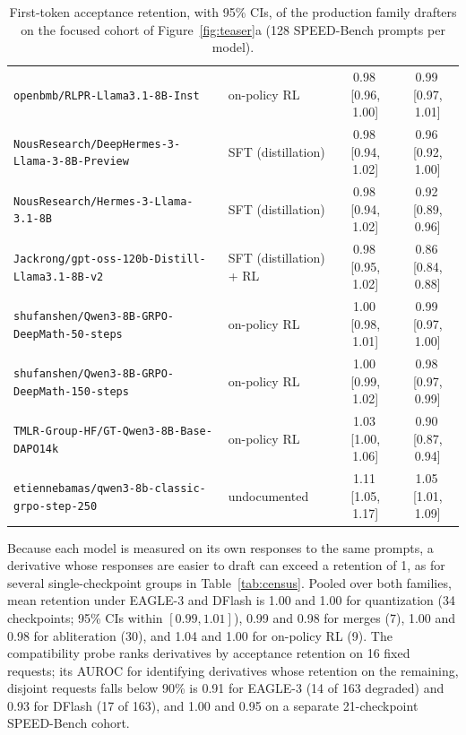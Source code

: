 \documentclass[11pt]{article}
\begin{document}
\begin{table}[t]
\begin{tabular}{@{}llcc@{}}
    \texttt{openbmb/RLPR-Llama3.1-8B-Inst} & on-policy RL & 0.98\,{\scriptsize[0.96, 1.00]} & 0.99\,{\scriptsize[0.97, 1.01]} \\
    \texttt{NousResearch/DeepHermes-3-Llama-3-8B-Preview} & SFT (distillation) & 0.98\,{\scriptsize[0.94, 1.02]} & 0.96\,{\scriptsize[0.92, 1.00]} \\
    \texttt{NousResearch/Hermes-3-Llama-3.1-8B} & SFT (distillation) & 0.98\,{\scriptsize[0.94, 1.02]} & 0.92\,{\scriptsize[0.89, 0.96]} \\
    \texttt{Jackrong/gpt-oss-120b-Distill-Llama3.1-8B-v2} & SFT (distillation) + RL & 0.98\,{\scriptsize[0.95, 1.02]} & 0.86\,{\scriptsize[0.84, 0.88]} \\
    \texttt{shufanshen/Qwen3-8B-GRPO-DeepMath-50-steps} & on-policy RL & 1.00\,{\scriptsize[0.98, 1.01]} & 0.99\,{\scriptsize[0.97, 1.00]} \\
    \texttt{shufanshen/Qwen3-8B-GRPO-DeepMath-150-steps} & on-policy RL & 1.00\,{\scriptsize[0.99, 1.02]} & 0.98\,{\scriptsize[0.97, 0.99]} \\
    \texttt{TMLR-Group-HF/GT-Qwen3-8B-Base-DAPO14k} & on-policy RL & 1.03\,{\scriptsize[1.00, 1.06]} & 0.90\,{\scriptsize[0.87, 0.94]} \\
    \texttt{etiennebamas/qwen3-8b-classic-grpo-step-250} & undocumented & 1.11\,{\scriptsize[1.05, 1.17]} & 1.05\,{\scriptsize[1.01, 1.09]} \\
    \bottomrule
  \end{tabular}
  \caption{First-token acceptance retention, with 95\% CIs, of the production family drafters on the focused cohort of Figure~\ref{fig:teaser}a (128 SPEED-Bench prompts per model).}
  \label{tab:focused}
\end{table}

Because each model is measured on its own responses to the same prompts, a derivative whose responses are easier to draft can exceed a retention of 1, as for several single-checkpoint groups in Table~\ref{tab:census}.
Pooled over both families, mean retention under EAGLE-3 and DFlash is 1.00 and 1.00 for quantization (34 checkpoints; 95\% CIs within $[0.99, 1.01]$), 0.99 and 0.98 for merges (7), 1.00 and 0.98 for abliteration (30), and 1.04 and 1.00 for on-policy RL (9).
The compatibility probe ranks derivatives by acceptance retention on 16 fixed requests; its AUROC for identifying derivatives whose retention on the remaining, disjoint requests falls below 90\% is 0.91 for EAGLE-3 (14 of 163 degraded) and 0.93 for DFlash (17 of 163), and 1.00 and 0.95 on a separate 21-checkpoint SPEED-Bench cohort.
\end{document}
